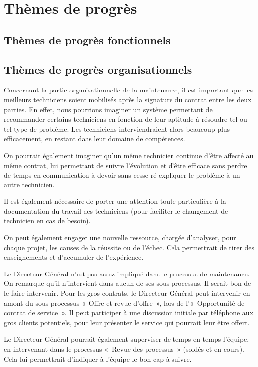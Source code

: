 \chapter{Thèmes de progrès}

\section{Thèmes de progrès fonctionnels}

\section{Thèmes de progrès organisationnels}

Concernant la partie organisationnelle de la maintenance, il est important que les meilleurs techniciens soient mobilisés après la signature du contrat entre les deux parties. En effet, nous pourrions imaginer un système permettant de recommander certains techniciens en fonction de leur aptitude à résoudre tel ou tel type de problème. Les techniciens interviendraient alors beaucoup plus efficacement, en restant dans leur domaine de compétences.

On pourrait également imaginer qu'un même technicien continue d'être affecté au même contrat, lui permettant de suivre l'évolution et d'être efficace sans perdre de temps en communication à devoir sans cesse ré-expliquer le problème à un autre technicien.

Il est également nécessaire de porter une attention toute particulière à la documentation du travail des techniciens (pour faciliter le changement de technicien en cas de besoin).

On peut également engager une nouvelle ressource, chargée d'analyser, pour chaque projet, les causes de la réussite ou de l'échec. Cela permettrait de tirer des enseignements et d'accumuler de l'expérience.

Le Directeur Général n'est pas assez impliqué dans le processus de maintenance. On remarque qu'il n'intervient dans aucun de ses sous-processus. Il serait bon de le faire intervenir.
Pour les gros contrats, le Directeur Général peut intervenir en amont du sous-processus «~Offre et revue d'offre~», lors de l'«~Opportunité de contrat de service~». Il peut participer à une discussion initiale par téléphone aux gros clients potentiels, pour leur présenter le service qui pourrait leur être offert.

Le Directeur Général pourrait également superviser de temps en temps l'équipe, en intervenant dans le processus «~Revue des processus~» (soldés et en cours). Cela lui permettrait d'indiquer à l'équipe le bon cap à suivre.

